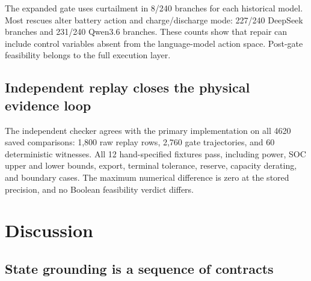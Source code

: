 \documentclass[11pt]{article}
\newcommand{\PhysicsComparisons}{4620}
\newcommand{\PhysicsFixtures}{12}
\begin{document}
\begin{table}[!htbp]
\centering
\caption{Matched LLM-minus-zero differences under the battery-only gate. Support is
positive/zero/negative. Negative regret favors the LLM proposal. Intervals are
scenario-resampling stability intervals.}
\label{tab:gate-zero}
\small
{}
\end{table}

The expanded gate uses curtailment in 8/240 branches for each historical model. Most rescues alter
battery action and charge/discharge mode: 227/240 DeepSeek branches and 231/240 Qwen3.6 branches.
These counts show that repair can include control variables absent from the language-model action
space. Post-gate feasibility belongs to the full execution layer.

\subsection{Independent replay closes the physical evidence loop}

The independent checker agrees with the primary implementation on all \PhysicsComparisons{}
saved comparisons: 1,800 raw replay rows, 2,760 gate trajectories, and 60 deterministic witnesses.
All \PhysicsFixtures{} hand-specified fixtures pass, including power, SOC upper and lower bounds,
export, terminal tolerance, reserve, capacity derating, and boundary cases. The maximum numerical
difference is zero at the stored precision, and no Boolean feasibility verdict differs.

\section{Discussion}
\label{sec:discussion}

\subsection{State grounding is a sequence of contracts}
\end{document}
